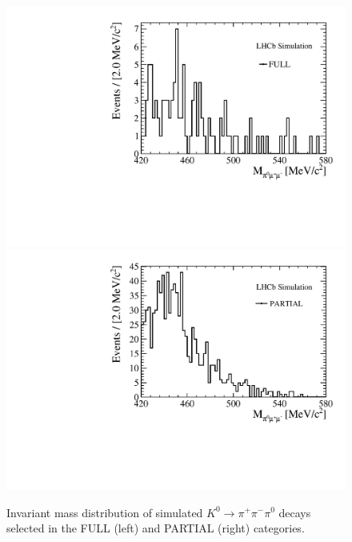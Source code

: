 \begin{figure} [htb!]
\begin{center}
\includegraphics[scale=0.30]{figs/Kspi0MuMu/M_VC_K3pi.pdf}%
\includegraphics[scale=0.30]{figs/Kspi0MuMu/M_V0_K3pi.pdf}%
\caption{Invariant mass distribution of simulated $K^0\rightarrow\pi^+\pi^-\pi^0$ decays selected in the FULL (left) and PARTIAL (right) categories.  \label{fig:KLTpi}}
\end{center}
\end{figure}

